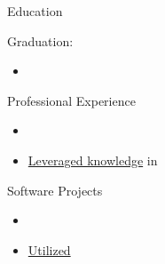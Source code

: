 \documentclass[]{mcdowellcv}
\begin{document}
	\makeheader
		{
			\href{https://}{\VAR{contact.github}}
			\href{https://}{\VAR{contact.gitlab}}
			\href{https://}{\VAR{contact.linkedin}}
		}
		{}
		{ \linebreak \href{mailto:}{\VAR{contact.email}}}
	
	\begin{cvsection}{Education}
		\begin{cvsubsection}{}{}{Graduation: }
			\begin{itemize}
				\item {}
			\end{itemize}
		\end{cvsubsection}
	\end{cvsection}

	\begin{cvsection}{Professional Experience}
		\begin{cvsubsection}{}{}{}
			\begin{itemize}
				\item {}
				\item \ul{Leveraged knowledge} in 
			\end{itemize}
	    \end{cvsubsection}
	\end{cvsection}
	
	\begin{cvsection}{Software Projects}
		\begin{cvsubsection}
			{\href{\VAR{project.url}}{}}
			{}
			{}
			\begin{itemize}
				\item {}
				\item \ul{Utilized} 
			\end{itemize}
	    \end{cvsubsection}
	\end{cvsection}
\end{document}
